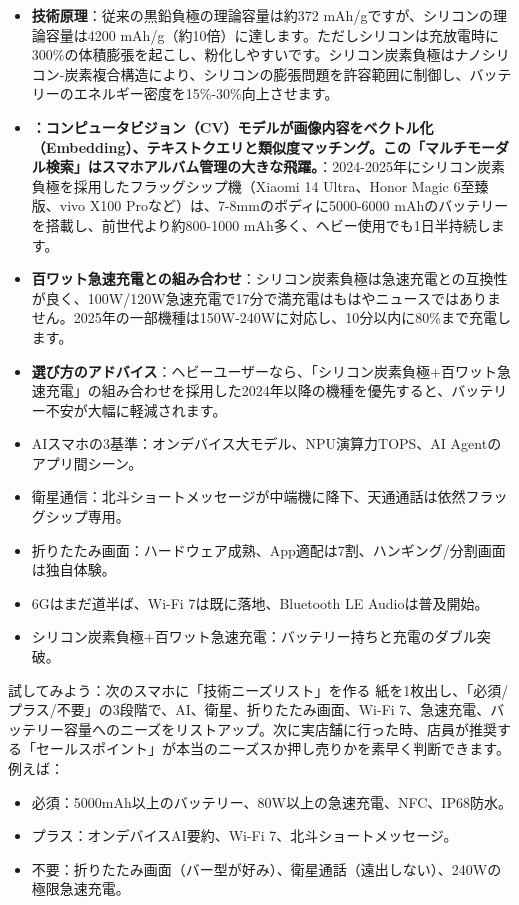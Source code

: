 \begin{itemize}
  \item \textbf{技術原理}：従来の黒鉛負極の理論容量は約372 mAh/gですが、シリコンの理論容量は4200 mAh/g（約10倍）に達します。ただしシリコンは充放電時に300\%の体積膨張を起こし、粉化しやすいです。シリコン炭素負極はナノシリコン-炭素複合構造により、シリコンの膨張問題を許容範囲に制御し、バッテリーのエネルギー密度を15\%-30\%向上させます。
  \item \textbf{：コンピュータビジョン（CV）モデルが画像内容をベクトル化（Embedding）、テキストクエリと類似度マッチング。この「マルチモーダル検索」はスマホアルバム管理の大きな飛躍。}：2024-2025年にシリコン炭素負極を採用したフラッグシップ機（Xiaomi 14 Ultra、Honor Magic 6至臻版、vivo X100 Proなど）は、7-8mmのボディに5000-6000 mAhのバッテリーを搭載し、前世代より約800-1000 mAh多く、ヘビー使用でも1日半持続します。
  \item \textbf{百ワット急速充電との組み合わせ}：シリコン炭素負極は急速充電との互換性が良く、100W/120W急速充電で17分で満充電はもはやニュースではありません。2025年の一部機種は150W-240Wに対応し、10分以内に80\%まで充電します。
  \item \textbf{選び方のアドバイス}：ヘビーユーザーなら、「シリコン炭素負極+百ワット急速充電」の組み合わせを採用した2024年以降の機種を優先すると、バッテリー不安が大幅に軽減されます。
\end{itemize}


\begin{itemize}
  \item AIスマホの3基準：オンデバイス大モデル、NPU演算力TOPS、AI Agentのアプリ間シーン。
  \item 衛星通信：北斗ショートメッセージが中端機に降下、天通通話は依然フラッグシップ専用。
  \item 折りたたみ画面：ハードウェア成熟、App適配は7割、ハンギング/分割画面は独自体験。
  \item 6Gはまだ道半ば、Wi-Fi 7は既に落地、Bluetooth LE Audioは普及開始。
  \item シリコン炭素負極+百ワット急速充電：バッテリー持ちと充電のダブル突破。
\end{itemize}

\begin{tcbpractice}{試してみよう：次のスマホに「技術ニーズリスト」を作る}
紙を1枚出し、「必須/プラス/不要」の3段階で、AI、衛星、折りたたみ画面、Wi-Fi 7、急速充電、バッテリー容量へのニーズをリストアップ。次に実店舗に行った時、店員が推奨する「セールスポイント」が本当のニーズスか押し売りかを素早く判断できます。例えば：

\begin{itemize}
  \item 必須：5000mAh以上のバッテリー、80W以上の急速充電、NFC、IP68防水。
  \item プラス：オンデバイスAI要約、Wi-Fi 7、北斗ショートメッセージ。
  \item 不要：折りたたみ画面（バー型が好み）、衛星通話（遠出しない）、240Wの極限急速充電。
\end{itemize}

\end{tcbpractice}

